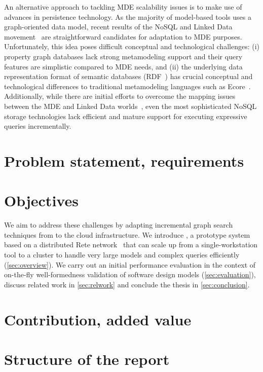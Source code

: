 An alternative approach to tackling MDE scalability issues is to make use of advances in persistence technology. As the majority of model-based tools uses a graph-oriented data model, recent results of the NoSQL and Linked Data movement~\cite{neo4j,openvirtuoso,sesame} are straightforward candidates for adaptation to MDE purposes. Unfortunately, this idea poses difficult conceptual and technological challenges: (i) property graph databases lack strong metamodeling support and their query features are simplistic compared to MDE needs, and (ii) the underlying data representation format of semantic databases (RDF~\cite{website:rdf_standard}) has crucial conceptual and technological differences to traditional metamodeling languages such as Ecore~\cite{EMF}. Additionally, while there are initial efforts to overcome the mapping issues between the MDE and Linked Data worlds~\cite{hillairet2008bridging}, even the most sophisticated NoSQL storage technologies lack efficient and mature support for executing expressive queries incrementally.

\section{Problem statement, requirements}

\cite{Scheidgen12} %


\section{Objectives}


We aim to address these challenges by adapting incremental graph search techniques from \eiq{} to the cloud infrastructure. We introduce \iqd, a prototype system based on a distributed Rete network~\cite{Forgy} that can scale up from a single-workstation tool to a cluster to handle very large models and complex queries efficiently (\autoref{sec:overview}). We carry out an initial performance evaluation in the context of on-the-fly well-formedness validation of software design models (\autoref{sec:evaluation}), discuss related work in \autoref{sec:relwork} and conclude the thesis in \autoref{sec:conclusion}.




\section{Contribution, added value}

\section{Structure of the report}


